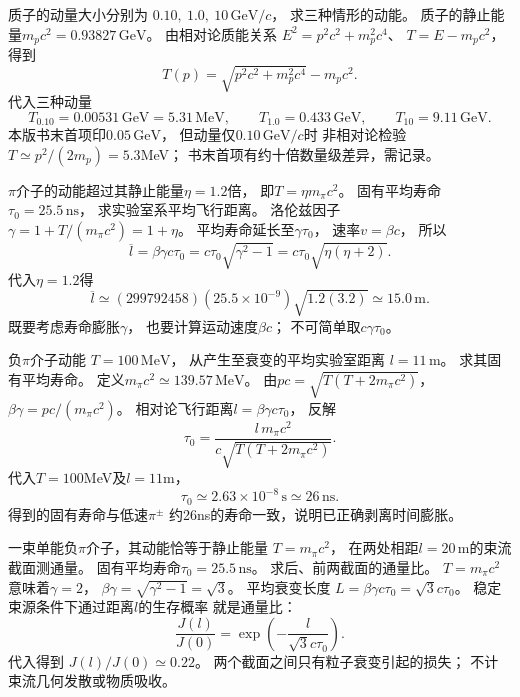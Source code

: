 质子的动量大小分别为
$0.10,\ 1.0,\ 10\,\mathrm{GeV}/c$，
求三种情形的动能。
\exsolution
质子的静止能量$m_pc^2=0.93827\,\mathrm{GeV}$。
由相对论质能关系
$E^2=p^2c^2+m_p^2c^4$、
$T=E-m_pc^2$，得到
\[
 \boxed{T(p)=\sqrt{p^2c^2+m_p^2c^4}-m_pc^2}.
\]
代入三种动量
\[
 \boxed{T_{0.10}=0.00531\,\mathrm{GeV}
 =5.31\,\mathrm{MeV}},\qquad
 \boxed{T_{1.0}=0.433\,\mathrm{GeV}},\qquad
 \boxed{T_{10}=9.11\,\mathrm{GeV}}.
\]
\excheck 本版书末首项印$0.05\,\mathrm{GeV}$，
但动量仅$0.10\,\mathrm{GeV}/c$时
非相对论检验$T\simeq p^2/(2m_p)=5.3$MeV；
书末首项有约十倍数量级差异，需记录。

$\pi$介子的动能超过其静止能量$\eta=1.2$倍，
即$T=\eta m_\pi c^2$。
固有平均寿命$\tau_0=25.5\,\mathrm{ns}$，
求实验室系平均飞行距离。
\exsolution
洛伦兹因子
$\gamma=1+T/(m_\pi c^2)=1+\eta$。
平均寿命延长至$\gamma\tau_0$，
速率$v=\beta c$，
所以
\[
 \overline l=\beta\gamma c\tau_0
 =c\tau_0\sqrt{\gamma^2-1}
 =\boxed{c\tau_0\sqrt{\eta(\eta+2)}}.
\]
代入$\eta=1.2$得
\[
 \boxed{\overline l\simeq
 (299792458)(25.5\times10^{-9})\sqrt{1.2(3.2)}
 \simeq15.0\,\mathrm m}.
\]
\excheck 既要考虑寿命膨胀$\gamma$，
也要计算运动速度$\beta c$；
不可简单取$c\gamma\tau_0$。

负$\pi$介子动能
$T=100\,\mathrm{MeV}$，
从产生至衰变的平均实验室距离
$l=11\,\mathrm m$。
求其固有平均寿命。
\exsolution
定义$m_\pi c^2\simeq139.57\,\mathrm{MeV}$。
由$pc=\sqrt{T(T+2m_\pi c^2)}$，
$\beta\gamma=pc/(m_\pi c^2)$。
相对论飞行距离$l=\beta\gamma c\tau_0$，
反解
\[
 \boxed{\tau_0=
 \frac{l\,m_\pi c^2}
 {c\sqrt{T(T+2m_\pi c^2)}}}.
\]
代入$T=100$MeV及$l=11$m，
\[
 \boxed{\tau_0\simeq2.63\times10^{-8}\,\mathrm s
 \simeq26\,\mathrm{ns}}.
\]
\excheck 得到的固有寿命与低速$\pi^\pm$
约26ns的寿命一致，说明已正确剥离时间膨胀。

一束单能负$\pi$介子，其动能恰等于静止能量
$T=m_\pi c^2$，
在两处相距$l=20\,\mathrm m$的束流截面测通量。
固有平均寿命$\tau_0=25.5\,\mathrm{ns}$。
求后、前两截面的通量比。
\exsolution
$T=m_\pi c^2$意味着$\gamma=2$，
$\beta\gamma=\sqrt{\gamma^2-1}=\sqrt3$。
平均衰变长度
$L=\beta\gamma c\tau_0=\sqrt3c\tau_0$。
稳定束源条件下通过距离$l$的生存概率
就是通量比：
\[
 \boxed{\frac{J(l)}{J(0)}
 =\exp\!\left(-\frac{l}{\sqrt3 c\tau_0}\right)}.
\]
代入得到
$\boxed{J(l)/J(0)\simeq0.22}$。
\excheck 两个截面之间只有粒子衰变引起的损失；
不计束流几何发散或物质吸收。

